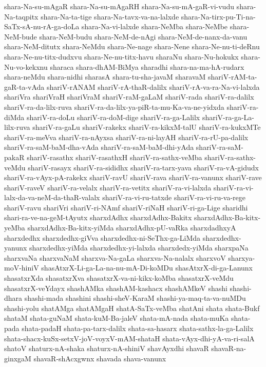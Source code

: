 {shara-Na-su-mAgaR
shara-Na-su-mAgaRH
shara-Na-su-mA-gaR-vi-vudu
shara-Na-taqpitx
shara-Na-ta-tige
shara-Na-tavx-va-na-lalxde
shara-Na-tirx-pu-Ti-na-SaTx-sA-nu-rA-ga-doLa
shara-Na-vi-lalxde
shara-NeMba
shara-NeMbe
shara-NeM-bude
shara-NeM-budu
shara-NeM-de-nAgi
shara-NeM-de-nanx-da-vanu
shara-NeM-ditutx
shara-NeMdu
shara-Ne-nage
shara-Nene
shara-Ne-nu-ti-deRnu
shara-Ne-nu-titx-dudxvu
shara-Ne-nu-titx-havu
sharaNu
shara-Nu-hokukx
shara-Nu-vo-kekxnu
sharaca
shara-dhAM-BiMya
sharadhi
shara-na-ma-hA-rudarx
shara-neMdu
shara-nidhi
sharasA
shara-tu-sha-javaM
sharavaM
shariV-rAM-ta-gaR-ta-vAda
shariV-rANAM
shariV-rA-thaR-dalilx
shariV-rA-va-ra-Na-vi-lalxda
shariVra
shariVraH
shariVraM
shariV-raM-gaLaM
shariV-rada
shariV-ra-dalilx
shariV-ra-da-lilx-ruva
shariV-ra-da-lilx-ya-piR-ta-mu-Ka-va-ne-yidxda
shariV-ra-diMda
shariV-ra-doLu
shariV-ra-doM-dige
shariV-ra-ga-Lalilx
shariV-ra-ga-La-lilx-ruva
shariV-ra-gaLu
shariV-rakekx
shariV-ra-kikxM-talU
shariV-ra-kukxMTe
shariV-ra-meVva
shariV-ra-nAyxsa
shariV-ra-ni-layAH
shariV-ra-rU-pa-dalilx
shariV-ra-saM-baM-dha-vAda
shariV-ra-saM-baM-dhi-yAda
shariV-ra-saM-pakaR
shariV-rasathx
shariV-rasathxH
shariV-ra-sathx-veMba
shariV-ra-sathx-veMdu
shariV-rasayx
shariV-ra-sididhx
shariV-ra-tarx-yava
shariV-ra-vA-gidudx
shariV-ra-vAyx-pA-rakekx
shariV-ravU
shariV-rava
shariV-ra-vanunx
shariV-rave
shariV-raveV
shariV-ra-velalx
shariV-ra-vetitx
shariV-ra-vi-lalxda
shariV-ra-vi-lalx-da-va-neM-da-thaR-valalx
shariV-ra-vi-ru-tatxde
shariV-ra-vi-ru-va-rege
shariV-ravu
shariVri
shariV-ri-NAmf
shariV-riNaH
shariV-ri-ga-Lige
sharidhi
shari-ra-ve-na-geM-tAyutx
sharxdAdhx
sharxdAdhx-Bakitx
sharxdAdhx-Ba-kitx-yeMba
sharxdAdhx-Ba-kitx-yiMda
sharxdAdhx-pU-vaRka
sharxdadhxyA
sharxdedhx
sharxdedhx-giVva
sharxdedhx-ni-SeThx-ga-LiMda
sharxdedhx-yanunx
sharxdedhx-yiMda
sharxdedhx-yi-lalxda
sharxdedx-yiMda
sharxpaNa
sharxvaNa
sharxvaNaM
sharxva-Na-gaLa
sharxva-Na-nalalx
sharxvoV
sharxya-moV-hiniV
shasAtxrX-Li-ga-La-na-nu-mA-Di-koMDu
shasAtxrX-di-ga-Lanunx
shasatxrXda
shasatxrXva
shasatxrX-va-ni-kikx-koMba
shasatxrX-veMdu
shasatxrX-veYdayx
shashAMka
shashAM-kashacx
shashAMkeV
shashi
shashi-dhara
shashi-mada
shashini
shashi-sheV-KaraM
shashi-ya-maq-ta-va-nuMDu
shashi-yolu
shatAMga
shatAMgaH
shatA-SaTx-veMba
shatAni
shata
shata-Bukf
shataM
shata-guNaM
shata-kuM-Ba-jaleV
shata-mA-nada
shata-muKa
shata-pada
shata-padaH
shata-pa-tarx-dalilx
shata-sa-hasarx
shata-sathx-la-ga-Lalilx
shata-shacx-kuSx-setxV-joV-voyxV-mAM-shataH
shata-vAyx-dhi-yA-va-ri-salA
shatoV
shaturx-nA-shaka
shaturx-nA-shiniV
shavAyxdhi
shavaR
shavaR-na-ginxgaM
shavaR-shAcxgwnx
shavada
shava-vanunx
}
